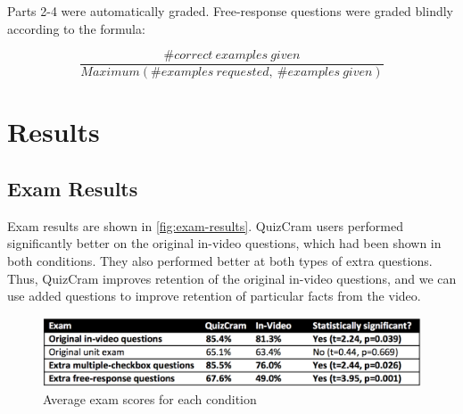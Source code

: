 \documentclass{sigchi}
\begin{document}
Parts 2-4 were automatically graded. Free-response questions were graded blindly according to the formula:

\vspace{-4mm}

\[ \frac{\# correct\ examples\ given}{Maximum(\# examples\ requested,\ \# examples\ given)} \]



\section{Results}

\subsection{Exam Results}

Exam results are shown in \autoref{fig:exam-results}.  QuizCram users performed significantly better on the original in-video questions, which had been shown in both conditions. They also performed better at both types of extra questions. Thus, QuizCram improves retention of the original in-video questions, and we can use added questions to improve retention of particular facts from the video.

\begin{figure}
\centering
\includegraphics[width=1.0\columnwidth]{exam-results}
\caption{Average exam scores for each condition}
\label{fig:exam-results}
\end{figure}
\end{document}
